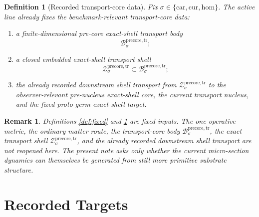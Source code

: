 \documentclass[11pt]{article}
\newcommand{\Car}{\mathrm{car}}
\newcommand{\Cur}{\mathrm{cur}}
\newcommand{\Hom}{\mathrm{hom}}
\newcommand{\PreCoreTrBody}[1]{\mathcal B_{#1}^{\mathrm{precore,tr}}}
\newcommand{\PreCoreTrShell}[1]{\mathcal Z_{#1}^{\mathrm{precore,tr}}}
\newtheorem{definition}{Definition}
\newtheorem{remark}{Remark}
\begin{document}
\begin{definition}[Recorded transport-core data]
\label{def:transport}
Fix \(\sigma\in\{\Car,\Cur,\Hom\}\). The active line already fixes the benchmark-relevant transport-core data:
\begin{enumerate}
    \item a finite-dimensional pre-core exact-shell transport body
    \[
    \PreCoreTrBody{\sigma};
    \]
    \item a closed embedded exact-shell transport shell
    \[
    \PreCoreTrShell{\sigma}\subset\PreCoreTrBody{\sigma};
    \]
    \item the already recorded downstream shell transport from \(\PreCoreTrShell{\sigma}\) to the observer-relevant pre-nucleus exact-shell core, the current transport nucleus, and the fixed proto-germ exact-shell target.
\end{enumerate}
\end{definition}

\begin{remark}
Definitions \ref{def:fixed} and \ref{def:transport} are fixed inputs. The one operative metric, the ordinary matter route, the transport-core body \(\PreCoreTrBody{\sigma}\), the exact transport shell \(\PreCoreTrShell{\sigma}\), and the already recorded downstream shell transport are not reopened here. The present note asks only whether the current micro-section dynamics can themselves be generated from still more primitive substrate structure.
\end{remark}

\section{Recorded Targets}
\end{document}
